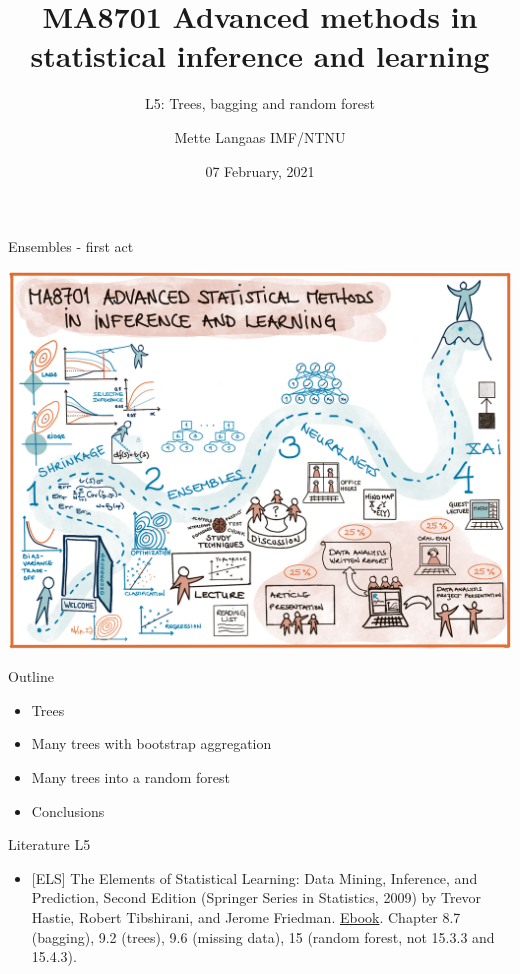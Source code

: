\documentclass[
  ignorenonframetext,
]{beamer}
\title{MA8701 Advanced methods in statistical inference and learning}
\subtitle{L5: Trees, bagging and random forest}
\author{Mette Langaas IMF/NTNU}
\date{07 February, 2021}
\providecommand{\tightlist}{%
  \setlength{\itemsep}{0pt}\setlength{\parskip}{0pt}}
\begin{document}
\frame{\titlepage}

\begin{frame}{Ensembles - first act}
\protect\hypertarget{ensembles---first-act}{}

\includegraphics[width=1\linewidth]{../MA8701courseplanv2}

\end{frame}

\begin{frame}

\begin{block}{Outline}

\begin{itemize}
\tightlist
\item
  Trees
\item
  Many trees with bootstrap aggregation
\item
  Many trees into a random forest
\item
  Conclusions
\end{itemize}

\end{block}

\begin{block}{Literature L5}

\begin{itemize}
\tightlist
\item
  {[}ELS{]} The Elements of Statistical Learning: Data Mining,
  Inference, and Prediction, Second Edition (Springer Series in
  Statistics, 2009) by Trevor Hastie, Robert Tibshirani, and Jerome
  Friedman.
  \href{https://web.stanford.edu/~hastie/Papers/ESLII.pdf}{Ebook}.
  Chapter 8.7 (bagging), 9.2 (trees), 9.6 (missing data), 15 (random
  forest, not 15.3.3 and 15.4.3).
\end{itemize}

\end{block}

\end{frame}
\end{document}

